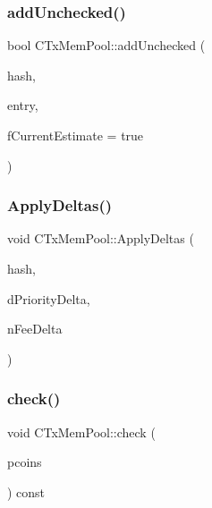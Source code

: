 \subsubsection{\texorpdfstring{add\+Unchecked()}{addUnchecked()}}
{\footnotesize\ttfamily bool C\+Tx\+Mem\+Pool\+::add\+Unchecked (\begin{DoxyParamCaption}\item[{const \mbox{\hyperlink{classuint256}{uint256}} \&}]{hash,  }\item[{const \mbox{\hyperlink{class_c_tx_mem_pool_entry}{C\+Tx\+Mem\+Pool\+Entry}} \&}]{entry,  }\item[{bool}]{f\+Current\+Estimate = {\ttfamily true} }\end{DoxyParamCaption})}

\mbox{\label{class_c_tx_mem_pool_aa73d1d5a211150fe169d73dc25ba3cdd}} 
\subsubsection{\texorpdfstring{Apply\+Deltas()}{ApplyDeltas()}}
{\footnotesize\ttfamily void C\+Tx\+Mem\+Pool\+::\+Apply\+Deltas (\begin{DoxyParamCaption}\item[{const \mbox{\hyperlink{classuint256}{uint256}}}]{hash,  }\item[{double \&}]{d\+Priority\+Delta,  }\item[{\mbox{\hyperlink{amount_8h_a4eaf3a5239714d8c45b851527f7cb564}{C\+Amount}} \&}]{n\+Fee\+Delta }\end{DoxyParamCaption})}

\mbox{\label{class_c_tx_mem_pool_ab30fadfa811829e79accca41da6a8328}} 
\subsubsection{\texorpdfstring{check()}{check()}}
{\footnotesize\ttfamily void C\+Tx\+Mem\+Pool\+::check (\begin{DoxyParamCaption}\item[{const \mbox{\hyperlink{class_c_coins_view_cache}{C\+Coins\+View\+Cache}} $\ast$}]{pcoins }\end{DoxyParamCaption}) const}

